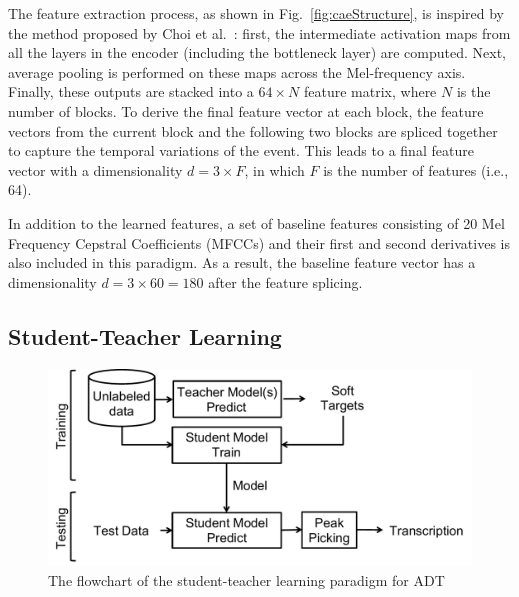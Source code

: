 \documentclass{article}
\newcommand{\comment}[1]{{\textcolor{blue}{#1}}}
\begin{document}
{\color{red}The feature extraction process, as shown in Fig.~\ref{fig:caeStructure}, is inspired by the method proposed by Choi et al.~\cite{Choi2017a}: first, the intermediate activation maps from all the layers in the encoder (including the bottleneck layer) are computed. Next, average pooling is performed on these maps across the Mel-frequency axis.} Finally, these outputs are stacked into a $64 \times N$ feature matrix, where $N$ is the number of blocks. %
To derive the final feature vector at each block, the feature vectors from the current block and the following two blocks are spliced together to capture the temporal variations of the event. This leads to a final feature vector with a dimensionality $d = 3 \times F$, in which $F$ is the number of features (i.e., 64). 

In addition to the learned features, a set of baseline features consisting of 20 Mel Frequency Cepstral Coefficients (MFCCs) and their first and second derivatives is also included in this paradigm. As a result, the baseline feature vector has a dimensionality $d = 3 \times 60 = 180$ after the feature splicing. 

\subsection{Student-Teacher Learning}
\label{subsec:studentTeacher}

\begin{figure}
\centering
\includegraphics[width = \columnwidth]{./figs/studentTeacherSys.pdf}
\caption{The flowchart of the student-teacher learning paradigm for ADT}
\label{fig:studentTeacherFlow}
\end{figure}
\end{document}
